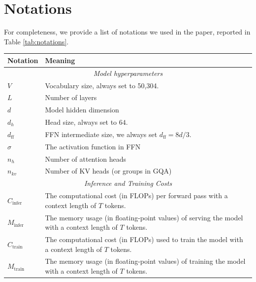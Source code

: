 \newpage
\section{Notations}
\label{sec:appendix-notations}

For completeness, we provide a list of notations we used in the paper, reported in Table \ref{tab:notations}.

\begin{table}[!t]
    \centering
    \footnotesize
    \begin{tabular}{l|p{5.6cm}}
        \toprule
        \textbf{Notation} & \textbf{Meaning} \\
        \bottomrule
        \toprule  
        \multicolumn{2}{c}{\textit{Model hyperparameters}}\\
        \midrule
        $V$ & Vocabulary size, always set to 50,304. \\
        \midrule
        $L$ & Number of layers \\
        \midrule
        $d$ & Model hidden dimension \\
        \midrule
        $d_h$ & Head size, always set to $64$. \\
        \midrule
        $d_\text{ff}$ & FFN intermediate size, we always set $d_\text{ff}=8d/3$. \\
        \midrule
        $\sigma$ & The activation function in FFN \\
        \midrule
        $n_h$ & Number of attention heads \\
        \midrule
        $n_{kv}$ & Number of KV heads (or groups in GQA) \\
        \bottomrule
        \toprule
        \multicolumn{2}{c}{\textit{Inference and Training Costs}}\\
        \midrule
        $C_\text{infer}$ & The computational cost (in FLOPs) per forward pass with a context length of $T$ tokens.\\
        \midrule
        $M_\text{infer}$ & The memory usage (in floating-point values) of serving the model with a context length of $T$ tokens. \\
        \midrule
        $C_\text{train}$ & The computational cost (in FLOPs) used to train the model with a context length of $T$ tokens.\\
        \midrule
        $M_\text{train}$ & The memory usage (in floating-point values) of training the model with a context length of $T$ tokens. \\

\end{tabular}
\end{table}
